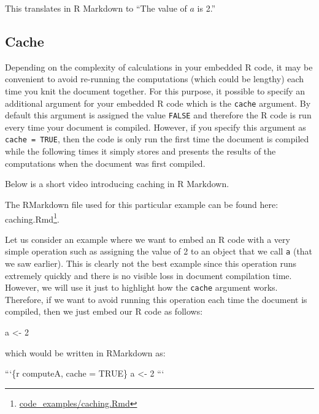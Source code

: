 \documentclass[12pt,]{krantz}
\newenvironment{Shaded}{\begin{snugshade}}{\end{snugshade}}
\newcommand{\DataTypeTok}[1]{\textcolor[rgb]{0.27,0.27,0.27}{#1}}
\newcommand{\DecValTok}[1]{\textcolor[rgb]{0.06,0.06,0.06}{#1}}
\newcommand{\StringTok}[1]{\textcolor[rgb]{0.5,0.5,0.5}{#1}}
\newcommand{\NormalTok}[1]{#1}
\renewcommand{\href}[2]{#2\footnote{\url{#1}}}
\begin{document}
This translates in R Markdown to ``The value of \(a\) is 2.''

\subsection{Cache}\label{cache}

Depending on the complexity of calculations in your embedded R code, it
may be convenient to avoid re-running the computations (which could be
lengthy) each time you knit the document together. For this purpose, it
possible to specify an additional argument for your embedded R code
which is the \texttt{cache} argument. By default this argument is
assigned the value \texttt{FALSE} and therefore the R code is run every
time your document is compiled. However, if you specify this argument as
\texttt{cache\ =\ TRUE}, then the code is only run the first time the
document is compiled while the following times it simply stores and
presents the results of the computations when the document was first
compiled.

Below is a short video introducing caching in R Markdown.

The RMarkdown file used for this particular example can be found here:
\href{code_examples/caching.Rmd}{caching.Rmd}.

Let us consider an example where we want to embed an R code with a very
simple operation such as assigning the value of 2 to an object that we
call \texttt{a} (that we saw earlier). This is clearly not the best
example since this operation runs extremely quickly and there is no
visible loss in document compilation time. However, we will use it just
to highlight how the \texttt{cache} argument works. Therefore, if we
want to avoid running this operation each time the document is compiled,
then we just embed our R code as follows:

\begin{Shaded}
\begin{Highlighting}[]
\NormalTok{a <-}\StringTok{ }\DecValTok{2}
\end{Highlighting}
\end{Shaded}

which would be written in RMarkdown as:

\begin{Shaded}
\begin{Highlighting}[]
\StringTok{```}\DataTypeTok{\{r computeA, cache = TRUE\}}
\DataTypeTok{a <- 2}
\StringTok{```}
\end{Highlighting}
\end{Shaded}
\end{document}
